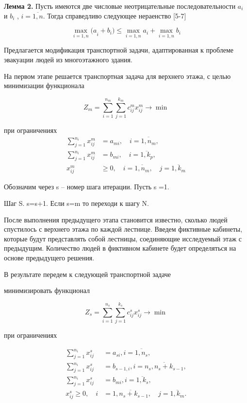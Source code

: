 \begin{multicols}{2}
{\bfseries Лемма 2.} Пусть имеются две числовые неотрицательные
последовательности \(a_{i}\) и \(b_{i}\) , \(i = \overline{1,n}\). Тогда
справедливо следующее нераенство {[}5-7{]}

\begin{equation}
\max_{i = 1,n}{(a}_{i} + b_{i}) \leq \max_{i = 1,n}a_{i} + \max_{i = 1,n}b_{i}
\end{equation}

Предлагается модификация транспортной задачи, адаптированная к проблеме
эвакуации людей из многоэтажного здания.

На первом этапе решается транспортная задача для верхнего этажа, с целью
минимизации функционала

\begin{equation}
Z_{m} = \sum_{i = 1}^{n_{m}}{\sum_{j = 1}^{k_{m}}{c_{ij}^{m}x_{ij}^{m} \rightarrow \min}}
\end{equation}

при ограничениях
\begin{equation}
\begin{aligned}
    \sum_{j = 1}^{n_{i}}x_{ij}^{m} &= a_{mi}, \quad i = \overline{1,n_{m}}, \\
    \sum_{j = 1}^{n_{i}}x_{ij}^{m} &= b_{mi}, \quad i = \overline{1,k_{p}}, \\
    x_{ij}^{m} &\geq 0, \quad i = \overline{1,n_{m}}, \quad j = \overline{1,k_{m}}
\end{aligned}
\end{equation}

Обозначим через s -- номер шага итерации. Пусть s =1.

Шаг S. s=s+1. Если s=m то переходи к шагу N.

После выполнения предыдущего этапа становится известно, сколько людей
спустилось с верхнего этажа по каждой лестнице. Введем фиктивные
кабинеты, которые будут представлять собой лестницы, соединяющие
исследуемый этаж с предыдущим. Количество людей в фиктивном кабинете
будет определяться на основе предыдущего решения.

В результате передем к следующей транспортной задаче

минимизировать функционал

\begin{equation}
Z_{s} = \sum_{i = 1}^{n_{s}}{\sum_{j = 1}^{k_{s}}{c_{ij}^{s}x_{ij}^{s} \rightarrow \min}}
\end{equation}

при ограничениях

\begin{equation}
\begin{aligned}
\sum_{j = 1}^{n_{i}}x_{ij}^{s} &= a_{si},i = \overline{1,n_{s}}, \\
\sum_{j = 1}^{n_{i}}x_{ij}^{s} &= b_{s - 1,i},i = \overline{n_{s},n_{s} + k_{s - 1}}, \\
\sum_{j = 1}^{n_{i}}x_{ij}^{s} &= b_{mi},i = \overline{1,k_{s}}, \\
x_{ij}^{s} \geq 0,\quad i &= \overline{1,n_{s} + k_{s - 1}},\quad j = \overline{1,k_{m}}.
\end{aligned}
\end{equation}


\end{multicols}
